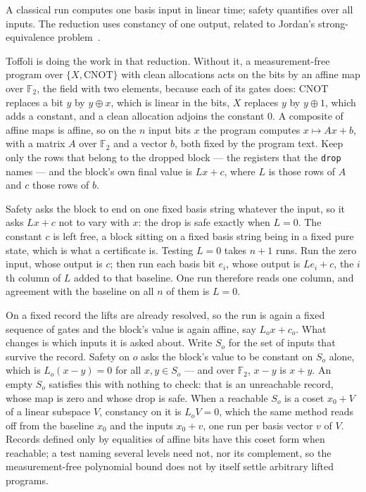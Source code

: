 \documentclass[acmsmall,screen,review,anonymous,nonacm]{acmart}
\begin{document}
A classical run computes one basis input in linear time; safety
quantifies over all inputs. The reduction uses constancy of one output,
related to Jordan's strong-equivalence problem~\cite{Jordan2014StrongEquivalence}.

Toffoli is doing the work in that reduction. Without it, a measurement-free
program over $\{X,\mathrm{CNOT}\}$ with clean allocations acts on the bits by
an affine map over $\mathbb F_2$, the field with two elements, because each of
its gates does: $\mathrm{CNOT}$ replaces a bit $y$ by $y \oplus x$, which is
linear in the bits, $X$ replaces $y$ by $y \oplus 1$, which adds a constant,
and a clean allocation adjoins the constant $0$. A composite of affine maps is
affine, so on the $n$ input bits $x$ the program computes $x \mapsto Ax+b$,
with a matrix $A$ over $\mathbb F_2$ and a vector $b$, both fixed by the
program text. Keep only the rows that belong to
the dropped block --- the registers that the \texttt{drop} names --- and the
block's own final value is $Lx+c$, where $L$ is those rows of $A$ and $c$
those rows of $b$.

Safety asks the block to end on one fixed basis string whatever the input, so
it asks $Lx+c$ not to vary with $x$: the drop is safe exactly when $L=0$. The
constant $c$ is left free, a block sitting on a fixed basis string being in a
fixed pure state, which is what a certificate is. Testing $L=0$ takes $n+1$
runs. Run the zero input, whose output is $c$; then run each basis bit $e_i$,
whose output is $Le_i+c$, the $i$th column of $L$ added to that baseline. One
run therefore reads one column, and agreement with the baseline on all $n$ of
them is $L=0$.

On a fixed record the lifts are already resolved, so the run is again a fixed
sequence of gates and the block's value is again affine, say $L_ox+c_o$. What
changes is which inputs it is asked about. Write $S_o$ for the set of inputs
that survive the record. Safety on $o$ asks the block's value to be constant
on $S_o$ alone, which is $L_o(x-y)=0$ for all $x,y \in S_o$ --- and over
$\mathbb F_2$, $x-y$ is $x+y$. An empty $S_o$ satisfies this with nothing to
check: that is an unreachable record, whose map is zero and whose drop is
safe. When a reachable $S_o$ is a coset $x_0+V$ of a linear subspace $V$,
constancy on it is $L_oV=0$, which the same method reads off from the baseline
$x_0$ and the inputs $x_0+v$, one run per basis vector $v$ of $V$. Records
defined only by equalities of affine bits have this coset form when reachable;
a test naming several levels need not, nor its complement, so the measurement-free polynomial
bound does not by itself settle arbitrary lifted programs.
\end{document}
